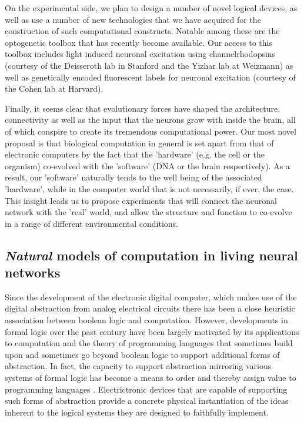 On the experimental side, we plan to design a number of novel logical devices, as well as use a number of new technologies that we have acquired for the construction of such computational constructs. Notable among these are the optogenetic toolbox that has recently become available. Our access to this toolbox includes light induced neuronal excitation using channelrhodopsins (courtesy of the Deisseroth lab in Stanford and the Yizhar lab at Weizmann) as well as genetically encoded fluorescent labels for neuronal excitation (courtesy of the Cohen lab at Harvard).

 Finally, it seems clear that evolutionary forces have shaped the architecture, connectivity as well as the input that the neurons grow with inside the brain, all of which conspire to create its tremendous computational power. Our most novel proposal is that  biological computation in general is set apart from that of electronic computers by the fact that the 'hardware' (e.g. the cell or the organism) co-evolved with the 'software' (DNA or the brain respectively). As a result, our 'software' naturally tends to the well being of the associated 'hardware', while in the computer world that is not necessarily, if ever, the case. This insight leads us to propose experiments that will connect the neuronal network with the 'real' world, and  allow the structure and function to co-evolve in a range of different environmental conditions.

\subsection{\emph{Natural} models of computation in living neural networks}

Since the development of the electronic digital computer, which makes
use of the digital abstraction \cite{Ward1989} from analog electrical circuits
there has been a close heuristic association between boolean logic and
computation. However, developments in formal logic over the past century
have been largely motivated by its applications to computation and the
theory of programming languages that sometimes build upon and sometimes
go beyond boolean logic to support additional forms of abstraction. In
fact, the capacity to support abstraction mirroring various systems of
formal logic has become a means to order and thereby assign value to
programming languages \cite{Abelson1996}. Electrictronic devices that are capable
of supporting such forms of abstraction provide a concrete physical
instantiation of the ideas inherent to the logical systems they are
designed to faithfully implement.

